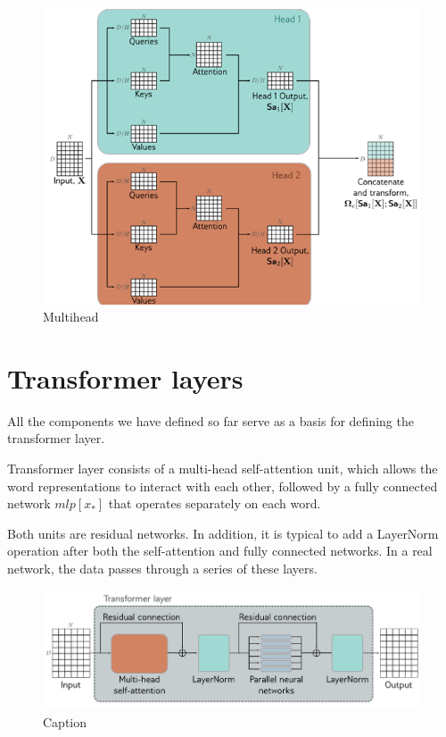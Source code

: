 \begin{figure}[!ht]
    \centering
    \includegraphics[width=\linewidth]{img/transformer/multihead.png}
    \caption{Multihead}
    \label{fig:enter-label}
\end{figure}
\section{Transformer layers}
All the components we have defined so far serve as a basis for defining the transformer layer.

Transformer layer consists of a multi-head self-attention unit, which allows the word representations to interact with 
each other, followed by a fully connected network $mlp[x_\ast]$ that operates separately on each word. 

Both units are residual networks. In addition, it is typical to add a LayerNorm operation after both the self-attention 
and fully connected networks. In a real network, the data passes through a series of these layers.

\begin{figure}[!ht]
    \centering
    \includegraphics[width=\linewidth]{img/transformer/transformerlayers.png}
    \caption{Caption}
    \label{fig:enter-label}
\end{figure}

